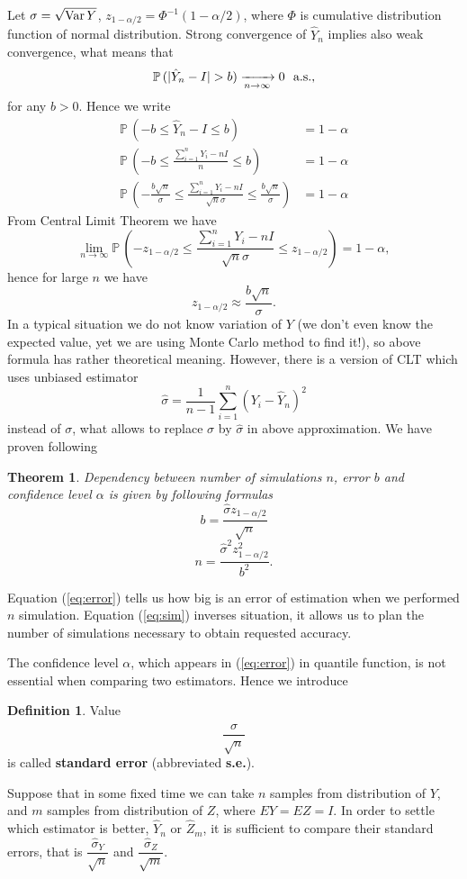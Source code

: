 \documentclass[a4paper,12pt, oneside]{book}
\newtheorem{thm}{Theorem}[section]
\theoremstyle{definition}
\newtheorem{mydef}{Definition}[section]
\theoremstyle{remark}
\def\Var{{\rm Var}\,}
\def\P{{\mathbb{P}}\,}
\def\conv{\xrightarrow[n \rightarrow \infty]{}}
\def\limn{\lim\limits_{n \rightarrow \infty} }
\begin{document}
Let $\sigma = \sqrt{\Var{Y}}$, $z_{1-\alpha/2} = \Phi^{-1}(1-\alpha/2)$, where $\Phi$ is cumulative distribution function of normal distribution. Strong convergence of $\hat{Y}_n$ implies also weak convergence, what means that
\[ \P(|\hat{Y}_n - I| > b) \conv 0 \hbox{\ \ a.s.,} \]
for any $b > 0$. 
Hence we write
\begin{align*}
 \P(-b \leq \hat{Y}_n - I \leq b) &= 1 - \alpha\\
 \P(-b \leq \frac{\sum\limits_{i=1}^n Y_i - nI}{n}  \leq b) &= 1 - \alpha\\
 \P(-\frac{b\sqrt{n}}{\sigma} \leq \frac{\sum\limits_{i=1}^n Y_i - nI}{\sqrt{n}\sigma}  \leq \frac{b\sqrt{n}}{\sigma}) &= 1 - \alpha
\end{align*}
From Central Limit Theorem we have
\[ \limn \P(-z_{1-\alpha/2} \leq \frac{\sum\limits_{i=1}^n Y_i - nI}{\sqrt{n}\sigma}  \leq z_{1-\alpha/2}) = 1 - \alpha, \]
hence for large $n$ we have
\[z_{1-\alpha/2} \approx \frac{b\sqrt{n}}{\sigma}.\]
In a typical situation we do not know variation of $Y$ (we don't even know the expected value, yet we are using Monte Carlo method to find it!), so above formula has rather theoretical meaning. However, there is a version of CLT which uses unbiased estimator
\[ \hat{\sigma} = \frac{1}{n-1}\sum\limits_{i=1}^n (Y_i - \hat{Y}_n)^2 \]
instead of $\sigma$, what allows to replace $\sigma$ by $\hat{\sigma}$ in above approximation. We have proven following 
\begin{thm}
 Dependency between number of simulations $n$, error $b$ and confidence level $\alpha$ is given by following formulas
 \begin{equation}
   \label{eq:error}
   b = \frac{\hat{\sigma} z_{1-\alpha/2}}{\sqrt{n}}
 \end{equation}
 \begin{equation}
   \label{eq:sim}
   n = \frac{\hat{\sigma}^2 z_{1-\alpha/2}^2}{b^2}.
 \end{equation}
\end{thm}
\noindent Equation (\ref{eq:error}) tells us how big is an error of estimation when we performed $n$ simulation. Equation (\ref{eq:sim}) inverses situation, it allows us to plan the number of simulations necessary to obtain requested accuracy.

The confidence level $\alpha$, which appears in (\ref{eq:error}) in quantile function, is not essential when comparing two estimators. Hence we introduce 
\begin{mydef}
 Value
 \begin{equation}
  \label{eq:stderr}
  \frac{\hat{\sigma}}{\sqrt{n}}
 \end{equation}
is called \textbf{standard error} (abbreviated \textbf{s.e.}).
\end{mydef}
Suppose that in some fixed time we can take $n$ samples from distribution of $Y$, and $m$ samples from distribution of $Z$, where $EY = EZ = I$. In order to settle which estimator is better, $\hat{Y}_n$ or $\hat{Z}_m$, it is sufficient to compare their standard errors, that is $\dfrac{\hat{\sigma}_Y}{\sqrt{n}}$ and $\dfrac{\hat{\sigma}_Z}{\sqrt{m}}$.
\end{document}
